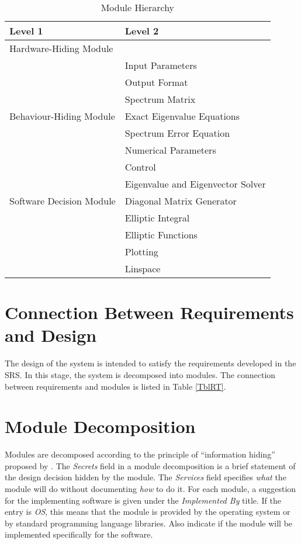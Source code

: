 \documentclass[12pt, titlepage]{article}
\begin{document}
\begin{table}[h]
\centering
\begin{tabular}{p{} p{}}
\toprule
\textbf{Level 1} & \textbf{Level 2}\\
\midrule

{Hardware-Hiding Module} & ~ \\
\midrule

\multirow{7}{0.3\textwidth}{Behaviour-Hiding Module} 
& Input Parameters \\
& Output Format \\
& Spectrum Matrix \\
& Exact Eigenvalue Equations \\
& Spectrum Error Equation \\
& Numerical Parameters \\  
& Control \\ 
\midrule

\multirow{3}{0.3\textwidth}{Software Decision Module} 
& Eigenvalue and Eigenvector Solver \\
& Diagonal Matrix Generator\\
& Elliptic Integral\\ 
& Elliptic Functions\\ 
& Plotting \\ 
& Linspace \\
\bottomrule

\end{tabular}
\caption{Module Hierarchy}
\label{TblMH}
\end{table}

\newpage 
\section{Connection Between Requirements and Design} \label{SecConnection}

The design of the system is intended to satisfy the requirements developed in
the SRS. In this stage, the system is decomposed into modules. The connection
between requirements and modules is listed in Table \ref{TblRT}.

\section{Module Decomposition} \label{SecMD}

Modules are decomposed according to the principle of ``information hiding''
proposed by \citet{ParnasEtAl1984}. The \emph{Secrets} field in a module
decomposition is a brief statement of the design decision hidden by the
module. The \emph{Services} field specifies \emph{what} the module will do
without documenting \emph{how} to do it. For each module, a suggestion for the
implementing software is given under the \emph{Implemented By} title. If the
entry is \emph{OS}, this means that the module is provided by the operating
system or by standard programming language libraries.  Also indicate if the
module will be implemented specifically for the software.
\end{document}
